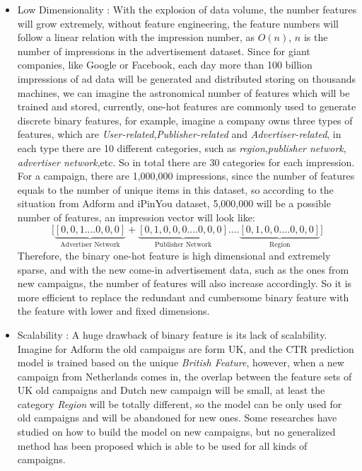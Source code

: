 \begin{itemize}
  \item Low Dimensionality : With the explosion of data volume, the number features will grow extremely, without feature engineering, the feature numbers will follow a linear relation with the impression number, as \(O(n)\), \(n\) is the number of impressions in the advertisement dataset. Since for giant companies, like Google or Facebook, each day more than 100 billion impressions of ad data will be generated and distributed storing on thousands machines, we can imagine the astronomical number of features which will be trained and stored, currently, one-hot features are commonly used to generate discrete binary features, for example, imagine a company owns three types of features, which are \textit{User-related},\textit{Publisher-related} and \textit{Advertiser-related}, in each type there are 10 different categories, such as \textit{region},\textit{publisher network}, \textit{advertiser network},etc. So in total there are 30 categories for each impression. For a campaign, there are 1,000,000 impressions, since the number of features equals to the number of unique items in this dataset, so according to the situation from Adform and iPinYou dataset, 5,000,000 will be a possible number of features, an impression vector will look like:
\begin{equation}
 \Big[\underbrace{[0,0,1....0,0,0]}_\textrm{Advertiser Network} + \underbrace{[0,1,0,0,0....0,0,0]}_\textrm{Publisher Network}.... \underbrace{[0,1,0,0....0,0,0]}_\textrm{Region}]
\end{equation}
Therefore, the binary one-hot feature is high dimensional and extremely sparse, and with the new come-in advertisement data, such as the ones from new campaigns, the number of features will also increase accordingly. So it is more efficient to replace the redundant and cumbersome binary feature with the feature with lower and fixed dimensions.

    \item Scalability : A huge drawback of binary feature is its lack of scalability. Imagine for Adform the old campaigns are form UK, and the CTR prediction model is trained based on the unique \textit{British Feature}, however, when a new campaign from Netherlands comes in, the overlap between the feature sets of UK old campaigns and Dutch new campaign will be small, at least the category \textit{Region} will be totally different, so the model can be only used for old campaigns and will be abandoned for new ones. Some researches have studied on how to build the model on new campaigns, but no generalized method has been proposed which is able to be used for all kinds of campaigns.
    

\end{itemize}
